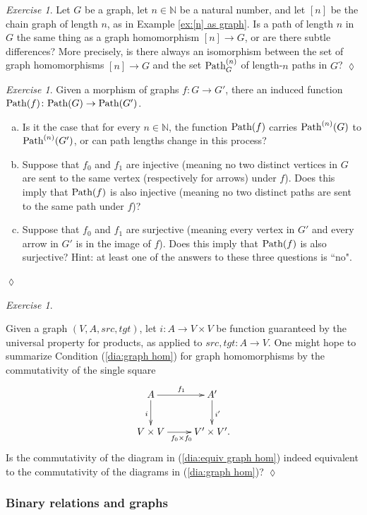 \documentclass{book}
\def\tn{\textnormal}
\def\NN{{\mathbb N}}
\def\Path{\tn{Path}}
\def\to{\rightarrow}
\def\taking{\colon}
\theoremstyle{remark}
\newtheorem{exc}[subsubsection]{Exercise}
\newenvironment{exercise}{\begin{exc}}{\hspace*{\fill}$\lozenge$\end{exc}}
\theoremstyle{definition}
\def\sexc{\begin{enumerate}[a.)]\setlength{\itemsep}{.1cm}\setlength{\parskip}{.1cm}\item}
\def\next{\item}
\def\endsexc{\end{enumerate}}
\begin{document}
\begin{exercise}
Let $G$ be a graph, let $n\in\NN$ be a natural number, and let $[n]$ be the chain graph of length $n$, as in Example \ref{ex:[n] as graph}. Is a path of length $n$ in $G$ the same thing as a graph homomorphism $[n]\to G$, or are there subtle differences? More precisely, is there always an isomorphism between the set of graph homomorphisms $[n]\to G$ and the set $\Path_G^{(n)}$ of length-$n$ paths in $G$?
\end{exercise}

\begin{exercise}
Given a morphism of graphs $f\taking G\to G'$, there an induced function $\Path(f)\taking\Path(G)\to\Path(G')$. 
\sexc Is it the case that for every $n\in\NN$, the function $\Path(f)$ carries $\Path^{(n)}(G)$ to $\Path^{(n)}(G')$, or can path lengths change in this process?
\next Suppose that $f_0$ and $f_1$ are injective (meaning no two distinct vertices in $G$ are sent to the same vertex (respectively for arrows) under $f$). Does this imply that $\Path(f)$ is also injective (meaning no two distinct paths are sent to the same path under $f$)?
\next Suppose that $f_0$ and $f_1$ are surjective (meaning every vertex in $G'$ and every arrow in $G'$ is in the image of $f$). Does this imply that $\Path(f)$ is also surjective? Hint: at least one of the answers to these three questions is ``no".
\endsexc
\end{exercise}

\begin{exercise}\label{exc:single condition for graph hom}

Given a graph $(V,A,src,tgt)$, let $i\taking A\to V\times V$ be function guaranteed by the universal property for products, as applied to $src,tgt\taking A\to V$. One might hope to summarize Condition (\ref{dia:graph hom}) for graph homomorphisms by the commutativity of the single square 
\begin{align}\label{dia:equiv graph hom}
\xymatrix{A\ar[r]^{f_1}\ar[d]_{i}&A'\ar[d]^{i'}\\V\times V\ar[r]_{f_0\times f_0}&V'\times V'.}
\end{align}
Is the commutativity of the diagram in (\ref{dia:equiv graph hom}) indeed equivalent to the commutativity of the diagrams in (\ref{dia:graph hom})?
\end{exercise}


\subsubsection{Binary relations and graphs}
\end{document}
